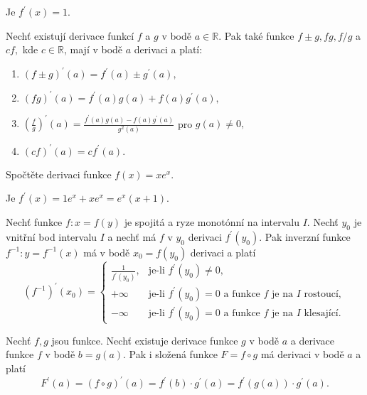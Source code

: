 \begin{reseni}
  Je $f^\prime(x)=1.$
\end{reseni}

\begin{veta}
Nechť existují derivace funkcí $f$ a $g$ v bodě $a\in \mathbb R.$ Pak
také funkce $f\pm g, fg, f/g$ a $cf,$ kde $c\in \mathbb R$, mají v bodě $a$ derivaci a platí:
\begin{enumerate}[$i.$]
\item $(f\pm g)^\prime (a) = f^\prime(a) \pm g^\prime(a),$
\item $(fg)^\prime (a) = f^\prime (a)g(a)+ f(a)g^\prime(a),$
\item $\left ( \frac{f}{g} \right )^\prime(a)=\frac{f^\prime (a)g(a)-f(a)g^\prime(a)}{g^2(a)} $ pro $g(a)\ne 0,$
\item $(cf)^\prime(a)=cf^\prime (a).$
\end{enumerate}
\end{veta}

\begin{priklad}
  Spočtěte derivaci funkce $f(x)=xe^x.$
\end{priklad}

\begin{reseni}
  Je $f^\prime(x)=1e^x+xe^x=e^x(x+1)$.
\end{reseni}

\begin{veta}
Nechť funkce $f:x=f(y)$ je spojitá a ryze monotónní na intervalu $I.$ Nechť $y_0$
je vnitřní bod intervalu $I$ a nechť má $f$ v $y_0$ derivaci $f^\prime(y_0).$
Pak inverzní funkce $f^{-1}:y=f^{-1}(x)$ má v bodě $x_0=f(y_0)$ derivaci a platí
$$
\left ( f^{-1} \right )^\prime(x_0)= \begin{cases}
\frac{1}{f^\prime(y_0)}, & \textrm{je-li } f^\prime(y_0)\ne 0,\\
+\infty & \textrm{je-li } f^\prime (y_0)=0 \textrm{ a funkce } f \textrm{ je na } I \textrm{ rostoucí},\\
-\infty & \textrm{je-li } f^\prime (y_0)=0 \textrm{ a funkce } f \textrm{ je na } I \textrm{ klesající}.
\end{cases}
$$
\end{veta}

\begin{veta}
Nechť $f, g$ jsou funkce. Nechť existuje derivace funkce $g$ v bodě $a$ a
derivace funkce $f$ v bodě $b=g(a).$ Pak i složená funkce $F=f\circ g$ má derivaci
v bodě $a$ a platí
$$F^\prime(a)=(f\circ g)^\prime (a) = f^\prime(b)\cdot g^\prime(a)=f^\prime(g(a))\cdot g^\prime(a).$$
\end{veta}

